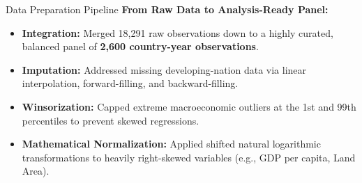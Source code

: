 \documentclass[aspectratio=169]{beamer}
\begin{document}
\begin{frame}{Data Preparation Pipeline}
  \textbf{From Raw Data to Analysis-Ready Panel:}
  \begin{itemize}
      \item \textbf{Integration:} Merged 18,291 raw observations down to a highly curated, balanced panel of \textbf{2,600 country-year observations}.
      \item \textbf{Imputation:} Addressed missing developing-nation data via linear interpolation, forward-filling, and backward-filling.
      \item \textbf{Winsorization:} Capped extreme macroeconomic outliers at the 1st and 99th percentiles to prevent skewed regressions.
      \item \textbf{Mathematical Normalization:} Applied shifted natural logarithmic transformations to heavily right-skewed variables (e.g., GDP per capita, Land Area).
  \end{itemize}
\end{frame}
\end{document}
